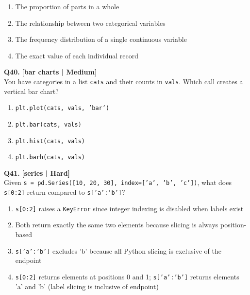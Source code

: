 \begin{enumerate}[label=(\alph*),topsep=2pt,itemsep=1pt,partopsep=0pt,parsep=0pt]
    \item \relax The proportion of parts in a whole
    \item \relax The relationship between two categorical variables
    \item \relax The frequency distribution of a single continuous variable
    \item \relax The exact value of each individual record
\end{enumerate}
\vspace{2mm}

\noindent\textbf{Q40.} \hfill {\small\color{LPUOrange}\textbf{[bar charts | Medium]}}\\[2pt]
You have categories in a list \texttt{cats} and their counts in \texttt{vals}. Which call creates a vertical bar chart?

\begin{enumerate}[label=(\alph*),topsep=2pt,itemsep=1pt,partopsep=0pt,parsep=0pt]
    \item \relax \texttt{plt.plot(cats, vals, 'bar')}
    \item \relax \texttt{plt.bar(cats, vals)}
    \item \relax \texttt{plt.hist(cats, vals)}
    \item \relax \texttt{plt.barh(cats, vals)}
\end{enumerate}
\vspace{2mm}

\noindent\textbf{Q41.} \hfill {\small\color{LPUOrange}\textbf{[series | Hard]}}\\[2pt]
Given \texttt{s = pd.Series([10, 20, 30], index=['a', 'b', 'c'])}, what does \texttt{s[0:2]} return compared to \texttt{s['a':'b']}?

\begin{enumerate}[label=(\alph*),topsep=2pt,itemsep=1pt,partopsep=0pt,parsep=0pt]
    \item \relax \texttt{s[0:2]} raises a \texttt{KeyError} since integer indexing is disabled when labels exist
    \item \relax Both return exactly the same two elements because slicing is always position-based
    \item \relax \texttt{s['a':'b']} excludes 'b' because all Python slicing is exclusive of the endpoint
    \item \relax \texttt{s[0:2]} returns elements at positions 0 and 1; \texttt{s['a':'b']} returns elements 'a' and 'b' (label slicing is inclusive of endpoint)
\end{enumerate}
\vspace{2mm}


